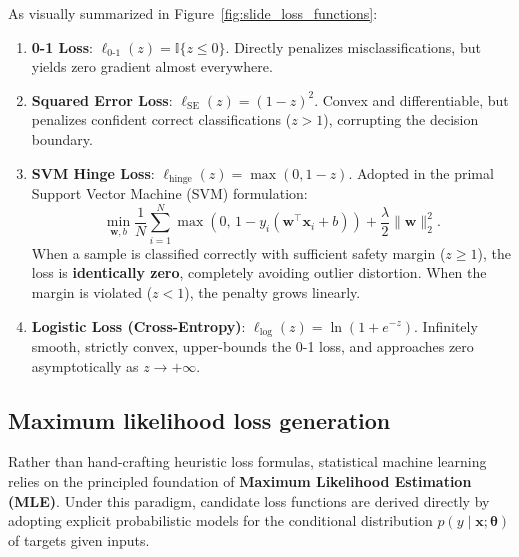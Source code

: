 As visually summarized in Figure~\ref{fig:slide_loss_functions}:
\begin{enumerate}[noitemsep,topsep=2pt,parsep=0pt,partopsep=0pt]
  \item \textbf{0-1 Loss}: $\ell_{0\text{-}1}(z) = \mathbb{I}\{z \le 0\}$. Directly penalizes misclassifications, but yields zero gradient almost everywhere.
  \item \textbf{Squared Error Loss}: $\ell_{\text{SE}}(z) = (1 - z)^2$. Convex and differentiable, but penalizes confident correct classifications ($z > 1$), corrupting the decision boundary.
  \item \textbf{SVM Hinge Loss}: $\ell_{\text{hinge}}(z) = \max(0, 1 - z)$. Adopted in the primal Support Vector Machine (SVM) formulation:
    \begin{equation}
    \min_{\mathbf{w}, b} \frac{1}{N} \sum_{i=1}^N \max\left(0, \, 1 - y_i(\mathbf{w}^\top \mathbf{x}_i + b)\right) + \frac{\lambda}{2} \|\mathbf{w}\|_2^2.
    \label{eq:svm_primal_objective}
    \end{equation}
    When a sample is classified correctly with sufficient safety margin ($z \ge 1$), the loss is \textbf{identically zero}, completely avoiding outlier distortion. When the margin is violated ($z < 1$), the penalty grows linearly.
  \item \textbf{Logistic Loss (Cross-Entropy)}: $\ell_{\text{log}}(z) = \ln(1 + e^{-z})$. Infinitely smooth, strictly convex, upper-bounds the 0-1 loss, and approaches zero asymptotically as $z \to +\infty$.
\end{enumerate}

\subsection{Maximum likelihood loss generation}
\label{sec:maximum_likelihood_logistic}
\label{sec:analytical_gradients}

Rather than hand-crafting heuristic loss formulas, statistical machine learning relies on the principled foundation of \textbf{Maximum Likelihood Estimation (MLE)}. Under this paradigm, candidate loss functions are derived directly by adopting explicit probabilistic models for the conditional distribution $p(y \mid \mathbf{x}; \boldsymbol{\theta})$ of targets given inputs.

